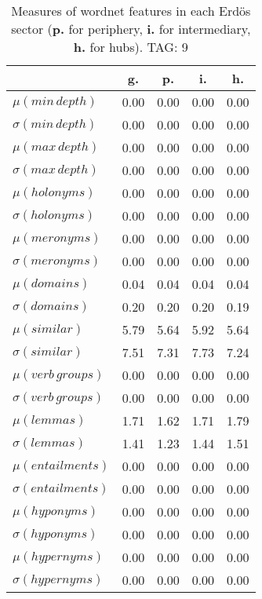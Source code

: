 \begin{table}[h!]
\begin{center}
\begin{tabular}{| l || c | c | c | c |}\hline
 & {\bf g.} & {\bf p.} & {\bf i.} & {\bf h.} \\\hline\hline
$\mu(min\,depth)$ & 0.00  & 0.00  & 0.00  & 0.00 \\
$\sigma(min\,depth)$ & 0.00  & 0.00  & 0.00  & 0.00 \\\hline
$\mu(max\,depth)$ & 0.00  & 0.00  & 0.00  & 0.00 \\
$\sigma(max\,depth)$ & 0.00  & 0.00  & 0.00  & 0.00 \\\hline
$\mu(holonyms)$ & 0.00  & 0.00  & 0.00  & 0.00 \\
$\sigma(holonyms)$ & 0.00  & 0.00  & 0.00  & 0.00 \\\hline
$\mu(meronyms)$ & 0.00  & 0.00  & 0.00  & 0.00 \\
$\sigma(meronyms)$ & 0.00  & 0.00  & 0.00  & 0.00 \\\hline
$\mu(domains)$ & 0.04  & 0.04  & 0.04  & 0.04 \\
$\sigma(domains)$ & 0.20  & 0.20  & 0.20  & 0.19 \\\hline
$\mu(similar)$ & 5.79  & 5.64  & 5.92  & 5.64 \\
$\sigma(similar)$ & 7.51  & 7.31  & 7.73  & 7.24 \\\hline
$\mu(verb\,groups)$ & 0.00  & 0.00  & 0.00  & 0.00 \\
$\sigma(verb\,groups)$ & 0.00  & 0.00  & 0.00  & 0.00 \\\hline
$\mu(lemmas)$ & 1.71  & 1.62  & 1.71  & 1.79 \\
$\sigma(lemmas)$ & 1.41  & 1.23  & 1.44  & 1.51 \\\hline
$\mu(entailments)$ & 0.00  & 0.00  & 0.00  & 0.00 \\
$\sigma(entailments)$ & 0.00  & 0.00  & 0.00  & 0.00 \\\hline
$\mu(hyponyms)$ & 0.00  & 0.00  & 0.00  & 0.00 \\
$\sigma(hyponyms)$ & 0.00  & 0.00  & 0.00  & 0.00 \\\hline
$\mu(hypernyms)$ & 0.00  & 0.00  & 0.00  & 0.00 \\
$\sigma(hypernyms)$ & 0.00  & 0.00  & 0.00  & 0.00 \\\hline
\end{tabular}
\caption{Measures of wordnet features in each Erd\"os sector ({{\bf p.}} for periphery, {{\bf i.}} for intermediary, {{\bf h.}} for hubs). TAG: 9}
\end{center}
\end{table}